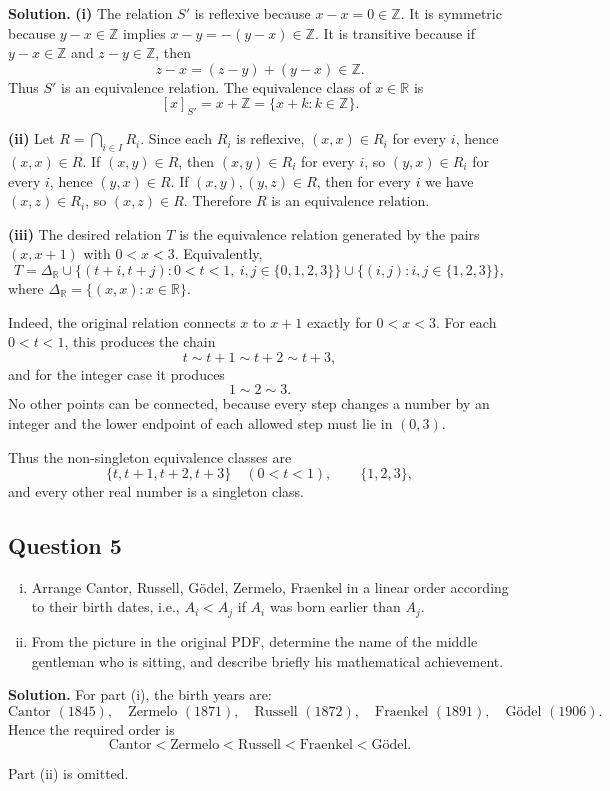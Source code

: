 \documentclass{article}
\newcommand{\R}{\mathbb{R}}
\newcommand{\Z}{\mathbb{Z}}
\newenvironment{solution}{\par\noindent\textbf{Solution.}\quad}{\par}
\begin{document}
\begin{solution}
\textbf{(i)} The relation $S'$ is reflexive because $x-x=0\in\Z$.
It is symmetric because $y-x\in\Z$ implies $x-y=-(y-x)\in\Z$.
It is transitive because if $y-x\in\Z$ and $z-y\in\Z$, then
\[
  z-x=(z-y)+(y-x)\in\Z.
\]
Thus $S'$ is an equivalence relation. The equivalence class of $x\in\R$ is
\[
  [x]_{S'}=x+\Z=\{x+k:k\in\Z\}.
\]

\textbf{(ii)} Let $R=\bigcap_{i\in I}R_i$. Since each $R_i$ is reflexive,
$(x,x)\in R_i$ for every $i$, hence $(x,x)\in R$. If $(x,y)\in R$, then
$(x,y)\in R_i$ for every $i$, so $(y,x)\in R_i$ for every $i$, hence
$(y,x)\in R$. If $(x,y),(y,z)\in R$, then for every $i$ we have
$(x,z)\in R_i$, so $(x,z)\in R$. Therefore $R$ is an equivalence relation.

\textbf{(iii)} The desired relation $T$ is the equivalence relation
generated by the pairs $(x,x+1)$ with $0<x<3$. Equivalently,
\[
  T=\Delta_{\R}
  \cup \{(t+i,t+j):0<t<1,\ i,j\in\{0,1,2,3\}\}
  \cup \{(i,j):i,j\in\{1,2,3\}\},
\]
where $\Delta_{\R}=\{(x,x):x\in\R\}$.

Indeed, the original relation connects $x$ to $x+1$ exactly for
$0<x<3$. For each $0<t<1$, this produces the chain
\[
  t\sim t+1\sim t+2\sim t+3,
\]
and for the integer case it produces
\[
  1\sim2\sim3.
\]
No other points can be connected, because every step changes a number by
an integer and the lower endpoint of each allowed step must lie in
$(0,3)$.

Thus the non-singleton equivalence classes are
\[
  \{t,t+1,t+2,t+3\}\quad(0<t<1),
  \qquad
  \{1,2,3\},
\]
and every other real number is a singleton class.
\end{solution}

\subsection{Question 5}
\begin{enumerate}[(i)]
  \item Arrange Cantor, Russell, G\"odel, Zermelo, Fraenkel in a linear order according to their birth dates, i.e., $A_i < A_j$ if $A_i$ was born earlier than $A_j$.
  \item From the picture in the original PDF, determine the name of the middle gentleman who is sitting, and describe briefly his mathematical achievement.
\end{enumerate}

\begin{solution}
For part (i), the birth years are:
\[
  \text{Cantor }(1845),\quad
  \text{Zermelo }(1871),\quad
  \text{Russell }(1872),\quad
  \text{Fraenkel }(1891),\quad
  \text{G\"odel }(1906).
\]
Hence the required order is
\[
  \text{Cantor}<\text{Zermelo}<\text{Russell}<\text{Fraenkel}<\text{G\"odel}.
\]

Part (ii) is omitted.
\end{solution}
\end{document}
